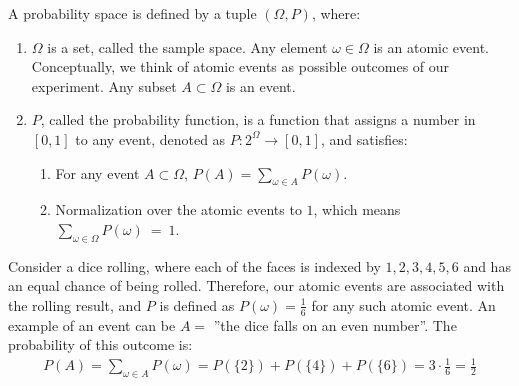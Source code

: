 \begin{definition}
  A probability space is defined by a tuple $(\Omega,P)$, where:
  \begin{enumerate} 
    \item $\Omega$ is a set, called the sample space. Any element $\omega\in \Omega$ is an atomic event. Conceptually, we think of atomic events as possible outcomes of our experiment. Any subset $A \subset \Omega$ is an event. 
    \item $P$, called the probability function, is a function that assigns a number in $[0,1]$ to any event, denoted as $P : 2^\Omega \rightarrow [0,1]$, and satisfies:
      \begin{enumerate}
        \item For any event $A \subset \Omega$, $P(A) = \sum_{\omega\in A}P(\omega)$. 
        \item Normalization over the atomic events to $1$, which means $\sum_{\omega\in\Omega}P(\omega)~=~1$.
      \end{enumerate}
  \end{enumerate}
\end{definition}
\begin{example}
  Consider a dice rolling, where each of the faces is indexed by $1,2,3,4,5,6$ and has an equal chance of being rolled. Therefore, our atomic events are associated with the rolling result, and $P$ is defined as $P(\omega) = \frac{1}{6}$ for any such atomic event.
  An example of an event can be $A=$ ''the dice falls on an even number''. The probability of this outcome is:
  \begin{equation*}
    \begin{split}
      P(A)= \sum_{\omega\in A}{ P(\omega) } = P(\{2\}) + P(\{4\}) + P(\{6\}) = 3\cdot \frac{1}{6} = \frac{1}{2} 
    \end{split}
  \end{equation*}
\end{example}

